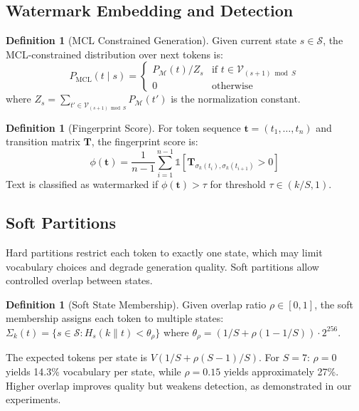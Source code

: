 \documentclass[11pt]{article}
\theoremstyle{definition}
\newtheorem{definition}[theorem]{Definition}
\theoremstyle{remark}
\begin{document}
\subsection{Watermark Embedding and Detection}

\begin{definition}[MCL Constrained Generation]
\label{def:constrained}
Given current state $s \in \mathcal{S}$, the MCL-constrained distribution over next tokens is:
$$P_{\text{MCL}}(t \mid s) = \begin{cases}
P_{\mathcal{M}}(t) / Z_s & \text{if } t \in \mathcal{V}_{(s+1) \bmod S} \\
0 & \text{otherwise}
\end{cases}$$
where $Z_s = \sum_{t' \in \mathcal{V}_{(s+1) \bmod S}} P_{\mathcal{M}}(t')$ is the normalization constant.
\end{definition}

\begin{definition}[Fingerprint Score]
\label{def:fingerprint}
For token sequence $\mathbf{t} = (t_1, \ldots, t_n)$ and transition matrix $\mathbf{T}$, the fingerprint score is:
$$\phi(\mathbf{t}) = \frac{1}{n-1} \sum_{i=1}^{n-1} \mathbb{1}[\mathbf{T}_{\sigma_k(t_i), \sigma_k(t_{i+1})} > 0]$$
Text is classified as watermarked if $\phi(\mathbf{t}) > \tau$ for threshold $\tau \in (k/S, 1)$.
\end{definition}

\subsection{Soft Partitions}

Hard partitions restrict each token to exactly one state, which may limit vocabulary choices and degrade generation quality. Soft partitions allow controlled overlap between states.

\begin{definition}[Soft State Membership]
\label{def:soft}
Given overlap ratio $\rho \in [0,1]$, the soft membership assigns each token to multiple states: $\Sigma_k(t) = \{s \in \mathcal{S} : H_s(k \| t) < \theta_{\rho}\}$ where $\theta_{\rho} = (1/S + \rho(1-1/S)) \cdot 2^{256}$.
\end{definition}

The expected tokens per state is $V(1/S + \rho(S-1)/S)$. For $S=7$: $\rho=0$ yields 14.3\% vocabulary per state, while $\rho=0.15$ yields approximately 27\%. Higher overlap improves quality but weakens detection, as demonstrated in our experiments.
\end{document}
